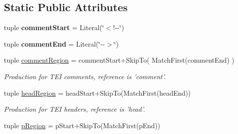 \subsection*{Static Public Attributes}
\begin{DoxyCompactItemize}
\item 
\hypertarget{classxutools_1_1parsers_1_1_t_e_i_lite_parser_a2d47139552ff6788d9dfe8ff239a4772}{tuple {\bfseries comment\-Start} = Literal(\char`\"{}$<$!-\/-\/\char`\"{})}\label{classxutools_1_1parsers_1_1_t_e_i_lite_parser_a2d47139552ff6788d9dfe8ff239a4772}

\item 
\hypertarget{classxutools_1_1parsers_1_1_t_e_i_lite_parser_aa32c33f1a2c3a9fda80064c4342b7a96}{tuple {\bfseries comment\-End} = Literal(\char`\"{}-\/-\/$>$\char`\"{})}\label{classxutools_1_1parsers_1_1_t_e_i_lite_parser_aa32c33f1a2c3a9fda80064c4342b7a96}

\item 
\hypertarget{classxutools_1_1parsers_1_1_t_e_i_lite_parser_ada58e2826fd1460fce2c76bba59afb81}{tuple \hyperlink{classxutools_1_1parsers_1_1_t_e_i_lite_parser_ada58e2826fd1460fce2c76bba59afb81}{comment\-Region} = comment\-Start+Skip\-To( Match\-First(comment\-End) )}\label{classxutools_1_1parsers_1_1_t_e_i_lite_parser_ada58e2826fd1460fce2c76bba59afb81}

\begin{DoxyCompactList}\small\item\em Production for T\-E\-I comments, reference is 'comment'. \end{DoxyCompactList}\item 
\hypertarget{classxutools_1_1parsers_1_1_t_e_i_lite_parser_a518d5701e5eaec79a72507a5b4670bd8}{tuple \hyperlink{classxutools_1_1parsers_1_1_t_e_i_lite_parser_a518d5701e5eaec79a72507a5b4670bd8}{head\-Region} = head\-Start+Skip\-To(Match\-First(head\-End))}\label{classxutools_1_1parsers_1_1_t_e_i_lite_parser_a518d5701e5eaec79a72507a5b4670bd8}

\begin{DoxyCompactList}\small\item\em Production for T\-E\-I headers, reference is 'head'. \end{DoxyCompactList}\item 
\hypertarget{classxutools_1_1parsers_1_1_t_e_i_lite_parser_ac55a5952c3487b4509af1903cbe50a3e}{tuple \hyperlink{classxutools_1_1parsers_1_1_t_e_i_lite_parser_ac55a5952c3487b4509af1903cbe50a3e}{p\-Region} = p\-Start+Skip\-To(Match\-First(p\-End))}\label{classxutools_1_1parsers_1_1_t_e_i_lite_parser_ac55a5952c3487b4509af1903cbe50a3e}


\end{DoxyCompactItemize}
